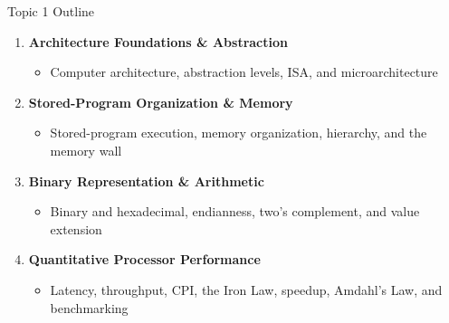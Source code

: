\documentclass[aspectratio=169,11pt,t]{beamer}
\newcommand{\key}[1]{\textbf{#1}}
\begin{document}

\begin{frame}{Topic 1 Outline}


\begin{enumerate}\setlength{\itemsep}{8pt}
  \item \key{Architecture Foundations \& Abstraction}
        \begin{itemize}
          \item Computer architecture, abstraction levels, ISA, and microarchitecture
        \end{itemize}

  \item \key{Stored-Program Organization \& Memory}
        \begin{itemize}
          \item Stored-program execution, memory organization, hierarchy, and the memory wall
        \end{itemize}

  \item \key{Binary Representation \& Arithmetic}
        \begin{itemize}
          \item Binary and hexadecimal, endianness, two's complement, and value extension
        \end{itemize}

  \item \key{Quantitative Processor Performance}
        \begin{itemize}
          \item Latency, throughput, CPI, the Iron Law, speedup, Amdahl's Law, and benchmarking
        \end{itemize}
\end{enumerate}

\end{frame}






\end{document}
